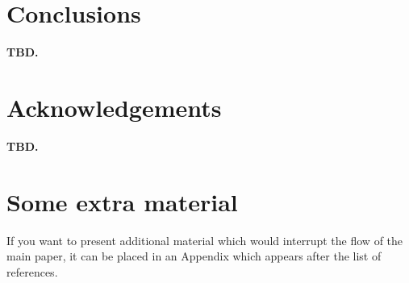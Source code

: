 \documentclass[fleqn,usenatbib]{mnras}
\begin{document}
\section{Conclusions}

\textbf{TBD.}

\section*{Acknowledgements}

\textbf{TBD.}











\appendix

\section{Some extra material}

If you want to present additional material which would interrupt the flow of the main paper,
it can be placed in an Appendix which appears after the list of references.



\bsp	%
\label{lastpage}
\end{document}
